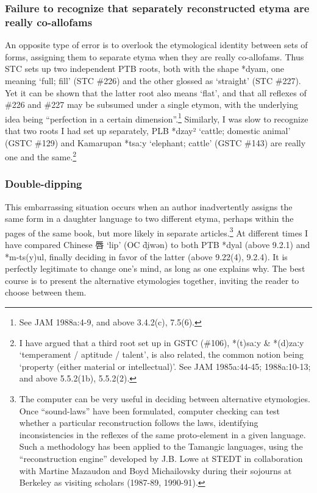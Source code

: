 \subsubsection{Failure to recognize that separately reconstructed etyma are really co-allofams}
An opposite type of error is to overlook the etymological identity between sets of forms, assigning them to separate etyma when they are really co-allofams. Thus STC sets up two independent PTB roots, both with the shape *dyam, one meaning `full; fill' (STC \#226) and the other glossed as `straight' (STC \#227). Yet it can be shown that the latter root also means `flat', and that all reflexes of \#226 and \#227 may be subsumed under a single etymon, with the underlying idea being ``perfection in a certain dimension''.\footnote{See JAM 1988a:4-9, and above 3.4.2(c), 7.5(6).} Similarly, I was slow to recognize that two roots I had set up separately, PLB *dzay² `cattle; domestic animal' (GSTC \#129) and Kamarupan *tsaːy `elephant; cattle' (GSTC \#143) are really one and the same.\footnote{I have argued that a third root set up in GSTC (\#106), *(t)saːy \& *(d)zaːy ‘temperament / aptitude / talent’, is also related, the common notion being ‘property (either material or intellectual)’. See JAM 1985a:44-45; 1988a:10-13; and above 5.5.2(1b), 5.5.2(2).}

\subsubsection{Double-dipping}
This embarrassing situation occurs when an author inadvertently assigns the same form in a daughter language to two different etyma, perhaps within the pages of the same book, but more likely in separate articles.\footnote{The computer can be very useful in deciding between alternative etymologies. Once “sound-laws” have been formulated, computer checking can test whether a particular reconstruction follows the laws, identifying inconsistencies in the reflexes of the same proto-element in a given language. Such a methodology has been applied to the Tamangic languages, using the “reconstruction engine” developed by J.B. Lowe at STEDT in collaboration with Martine Mazaudon and Boyd Michailovsky during their sojourns at Berkeley as visiting scholars (1987-89, 1990-91).} At different times I have compared Chinese 唇 `lip' (OC d̑i̯wən) to both PTB *dyal (above 9.2.1) and *m-ts(y)ul, finally deciding in favor of the latter (above 9.22(4), 9.2.4). It is perfectly legitimate to change one's mind, as long as one explains why. The best course is to present the alternative etymologies together, inviting the reader to choose between them.

